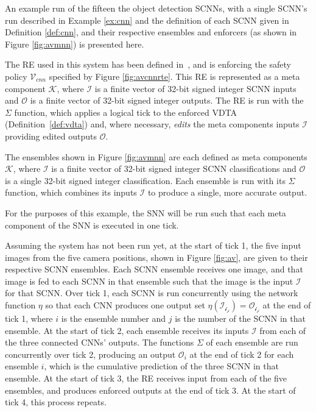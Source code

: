 \begin{example}
	\label{ex:runsnn}
	An example run of the fifteen the object detection \acp{SCNN}, with a single \ac{SCNN}'s run described in Example \ref{ex:cnn} and the definition of each \ac{SCNN} given in Definition \ref{def:cnn}, and their respective ensembles and enforcers (as shown in Figure \ref{fig:avmnn}) is presented here.
	
	The \ac{RE} used in this system has been defined in~\cite{recps}, and is enforcing the safety policy $\mathcal{V}_{cnn}$ specified by Figure \ref{fig:avcnnrte}.
	This \ac{RE} is represented as a meta component $\mathcal{K}$, where $\mathcal{I}$ is a finite vector of 32-bit signed integer \ac{SCNN} inputs and $\mathcal{O}$ is a finite vector of 32-bit signed integer outputs.
	The \ac{RE} is run with the $\Sigma$ function, which applies a logical tick to the enforced \ac{VDTA} (Definition~\ref{def:vdta}) and, where necessary, \textit{edits} the meta components inputs $\mathcal{I}$ providing edited outputs $\mathcal{O}$.
	
	The ensembles shown in Figure \ref{fig:avmnn} are each defined as meta components $\mathcal{K}$, where $\mathcal{I}$ is a finite vector of 32-bit signed integer \ac{SCNN} classifications and $\mathcal{O}$ is a single 32-bit signed integer classification.
	Each ensemble is run with its $\Sigma$ function, which combines its inputs $\mathcal{I}$ to produce a single, more accurate output.
	
	For the purposes of this example, the \ac{SNN} will be run such that each meta component of the \ac{SNN} is executed in one tick.
	
	Assuming the system has not been run yet, at the start of tick 1, the five input images from the five camera positions, shown in Figure \ref{fig:av}, are given to their respective \ac{SCNN} ensembles.
	Each \ac{SCNN} ensemble receives one image, and that image is fed to each \ac{SCNN} in that ensemble such that the image is the input $\mathcal{I}$ for that \ac{SCNN}.
	Over tick 1, each \ac{SCNN} is run concurrently using the network function $\eta$ so that each \ac{CNN} produces one output set $\eta(\mathcal{I_{i_j}}) = \mathcal{O_{i_j}}$ at the end of tick 1, where $i$ is the ensemble number and $j$ is the number of the \ac{SCNN} in that ensemble.
	At the start of tick 2, each ensemble receives its inputs $\mathcal{I}$ from each of the three connected \acp{CNN}' outputs.
	The functions $\Sigma$ of each ensemble are run concurrently over tick 2, producing an output $\mathcal{O}_i$ at the end of tick 2 for each ensemble $i$, which is the cumulative prediction of the three \ac{SCNN} in that ensemble.
	At the start of tick 3, the \ac{RE} receives input from each of the five ensembles, and produces enforced outputs at the end of tick 3.
	At the start of tick 4, this process repeats.
\end{example}












